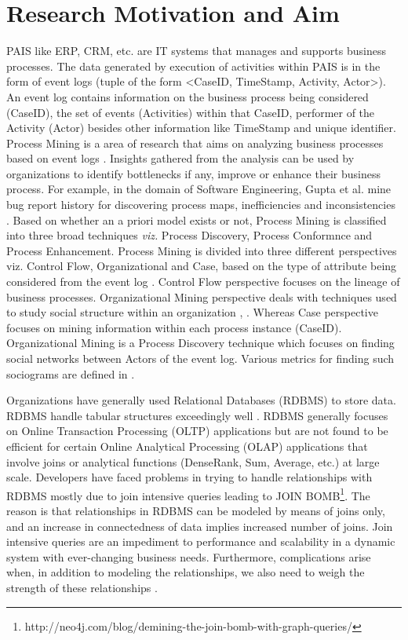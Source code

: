 \documentclass[11pt]{article}
\begin{document}
\section{Research Motivation and Aim}
\par{PAIS like ERP, CRM, etc. are IT systems that manages and supports business processes. The data generated by execution of activities within PAIS is in the form of event logs (tuple of the form <CaseID, TimeStamp, Activity, Actor>). An event log contains information on the business process being considered (CaseID), the set of events (Activities) within that CaseID, performer of the Activity (Actor) besides other information like TimeStamp and unique identifier. Process Mining is a area of research that aims on analyzing business processes based on event logs \cite{aalstmain}. Insights gathered from the analysis can be used by organizations to identify bottlenecks if any, improve or enhance their business process. For example, in the domain of Software Engineering, Gupta et al. mine bug report history for discovering process maps, inefficiencies and inconsistencies \cite{mgupta2014}. Based on whether an a priori model exists or not, Process Mining is classified into three broad techniques \textit{viz.} Process Discovery, Process Conformnce and Process Enhancement. Process Mining is divided into three different perspectives viz. Control Flow, Organizational and Case, based on the type of  attribute being considered from the event log \cite{aalstmain}. Control Flow perspective focuses on the lineage of business processes. Organizational Mining perspective deals with techniques used to study social structure within an organization \cite{aalst}, \cite{mxml}. Whereas Case perspective focuses on mining information within each process instance (CaseID). Organizational Mining is a Process Discovery technique which focuses on finding social networks between Actors of the event log. Various metrics for finding such sociograms are defined in \cite{aalst}.}
\par{Organizations have generally used Relational Databases (RDBMS) to store data. RDBMS handle tabular structures exceedingly well \cite{graphbook}. RDBMS generally focuses on Online Transaction Processing (OLTP) applications but are not found to be efficient for certain Online Analytical Processing (OLAP) applications that involve joins or analytical functions (Dense\textunderscore Rank, Sum, Average, etc.) at large scale. Developers have faced problems in trying to handle relationships with RDBMS mostly due to join intensive queries leading to JOIN BOMB\footnote{http://neo4j.com/blog/demining-the-join-bomb-with-graph-queries/}. The reason is that relationships in RDBMS can be modeled by means of joins only, and an increase in connectedness of data implies increased number of joins. Join intensive queries are an impediment to performance and scalability in a dynamic system with ever-changing business needs. Furthermore, complications arise when, in addition to modeling the relationships, we also need to weigh the strength of these relationships \cite{graphbook}.}
\end{document}
